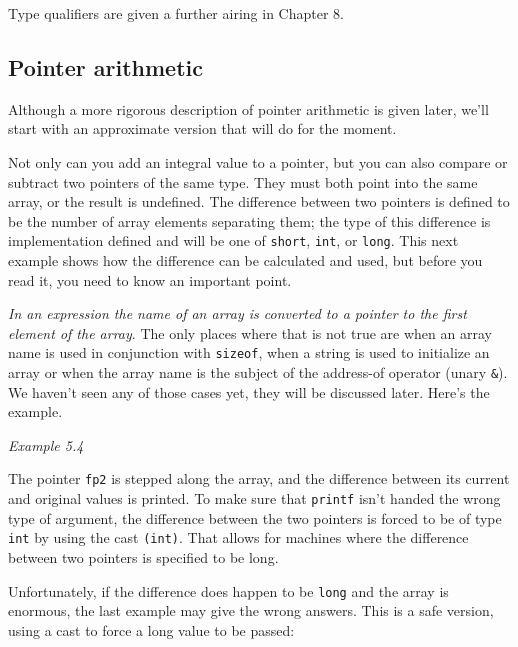    Type qualifiers are given a further airing in Chapter 8.


  

  \subsection{Pointer arithmetic}
   

   Although a more rigorous description of pointer arithmetic is given
    later, we'll start with an approximate version that will do for the
    moment.


   Not only can you add an integral value to a pointer, but you can also
    compare or subtract two pointers of the same type. They must both point
    into the same array, or the result is undefined. The difference between
    two pointers is defined to be the number of array elements separating
    them; the type of this difference is implementation defined and will be
    one of \texttt{short}, \texttt{int}, or \texttt{long}. This
    next example shows how the difference can be calculated and used, but
    before you read it, you need to know an important point.


   \textit{In an expression the name of an array is converted to a pointer to
    the first element of the array}. The only places where that is not
    true are when an array name is used in conjunction with
    \texttt{sizeof}, when a string is used to initialize an array or
    when the array name is the subject of the address-of operator (unary
    \texttt{\&}). We haven't seen any of those cases yet, they will
    be discussed later. Here's the example.


   \begin{center}\textit{Example 5.4}\end{center}


   The pointer \texttt{fp2} is stepped along the array, and the
    difference between its current and original values is printed. To make
    sure that \texttt{printf} isn't handed the wrong type of argument,
    the difference between the two pointers is forced to be of type
    \texttt{int} by using the cast \texttt{(int)}. That allows for
    machines where the difference between two pointers is specified to be
    long.


   Unfortunately, if the difference does happen to be \texttt{long}
    and the array is enormous, the last example may give the wrong answers.
    This is a safe version, using a cast to force a long value to be
    passed:


